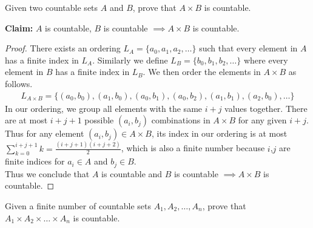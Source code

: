 \documentclass[11pt]{article}
\begin{document}
\begin{Parts}
    
    \Part Given two countable sets $A$ and $B$, prove that $A \times B$ is countable. 

    \begin{Answer}
        \textbf{Claim:} $A$ is countable, $B$ is countable $\implies A \times B$ is countable. 
        \begin{proof}
            There exists an ordering $L_A = \{a_0,a_1,a_2,\ldots\}$ such that every element in $A$ has a finite index in $L_A$. 
            Similarly we define $L_B = \{b_0,b_1,b_2,\ldots\}$ where every element in $B$ has a finite index in $L_B$. We then order 
            the elements in $A \times B$ as follows. 
            \begin{align*}
                L_{A \times B} = \{(a_0,b_0),(a_1,b_0),(a_0,b_1),(a_0,b_2),(a_1,b_1),(a_2,b_0),\ldots\}
            \end{align*}
            In our ordering, we group all elements with the same $i + j$ values together. There are at most $i + j + 1$ possible
            $(a_i,b_j)$ combinations in $A \times B$ for any given $i + j$. Thus for any element $(a_i,b_j) \in A \times B$, its index
            in our ordering is at most $\sum_{k=0}^{i+j+1} k = \frac{(i+j+1)(i+j+2)}{2}$, which is also a finite number because $i$,$j$
            are finite indices for $a_i \in A$ and $b_j \in B$. \\
            Thus we conclude that $A$ is countable and $B$ is countable $\implies A \times B$ is countable. 
        \end{proof}
    \end{Answer}

    \Part Given a finite number of countable sets $A_1, A_2, \ldots, A_n$, prove that $A_1 \times A_2 \times \ldots \times A_n$ is countable. 


\end{Parts}
\end{document}
